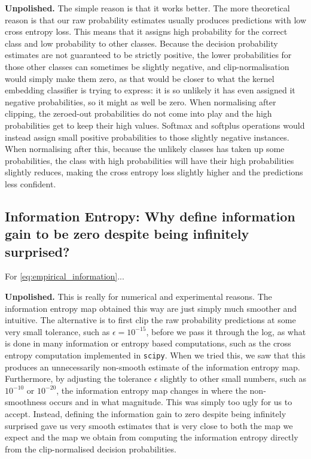 \documentclass{article}
\newcommand{\note}[1]{{\color{orange} #1}}
\begin{document}
		\note{\textbf{Unpolished.}} The simple reason is that it works better. The more theoretical reason is that our raw probability estimates usually produces predictions with low cross entropy loss. This means that it assigns high probability for the correct class and low probability to other classes. Because the decision probability estimates are not guaranteed to be strictly positive, the lower probabilities for those other classes can sometimes be slightly negative, and clip-normalisation would simply make them zero, as that would be closer to what the kernel embedding classifier is trying to express: it is so unlikely it has even assigned it negative probabilities, so it might as well be zero. When normalising after clipping, the zeroed-out probabilities do not come into play and the high probabilities get to keep their high values. Softmax and softplus operations would instead assign small positive probabilities to those slightly negative instances. When normalising after this, because the unlikely classes has taken up some probabilities, the class with high probabilities will have their high probabilities slightly reduces, making the cross entropy loss slightly higher and the predictions less confident.
		
	\subsection{Information Entropy: Why define information gain to be zero despite being infinitely surprised?}
	
		For \eqref{eq:empirical_information}...
		
		\note{\textbf{Unpolished.}} This is really for numerical and experimental reasons. The information entropy map obtained this way are just simply much smoother and intuitive. The alternative is to first clip the raw probability predictions at some very small tolerance, such as $\epsilon = 10^{-15}$, before we pass it through the log, as what is done in many information or entropy based computations, such as the cross entropy computation implemented in \texttt{scipy}. When we tried this, we saw that this produces an unnecessarily non-smooth estimate of the information entropy map. Furthermore, by adjusting the tolerance $\epsilon$ slightly to other small numbers, such as $10^{-10}$ or $10^{-20}$, the information entropy map changes in where the non-smoothness occurs and in what magnitude. This was simply too ugly for us to accept. Instead, defining the information gain to zero despite being infinitely surprised gave us very smooth estimates that is very close to both the map we expect and the map we obtain from computing the information entropy directly from the clip-normalised decision probabilities.
		
\end{document}
